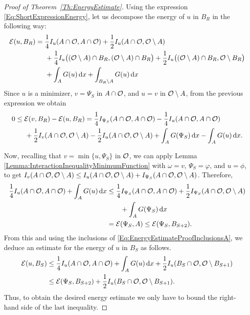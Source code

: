 \begin{proof}[Proof of Theorem~\ref{Th:EnergyEstimate}]
Using the expression \eqref{Eq:ShortExpressionEnergy}, let us decompose the energy of $u$ in $B_R$ in the following way:
\begin{align*}
\mathcal{E}(u,B_R) &= \frac{1}{4}I_u(A \cap \mathcal{O}, A \cap \mathcal{O}) + \frac{1}{2}I_u(A \cap \mathcal{O}, \mathcal{O} \setminus A) \\
& \hspace{5mm} + \frac{1}{4}I_u\big((\mathcal{O} \setminus A) \cap B_R, (\mathcal{O} \setminus A) \cap B_R\big) + \frac{1}{2}I_u\big((\mathcal{O} \setminus A) \cap B_R, \mathcal{O} \setminus B_R\big) \\
& \hspace{5mm} + \int_A G(u) \,\mathrm{d} x + \int_{B_R\setminus A} G(u) \,\mathrm{d} x
\end{align*}
Since $u$ is a minimizer, $v=\Psi_S$ in $A\cap \mathcal{O}$, and $u=v$ in $\mathcal{O}\setminus A$,  from the previous expression we obtain
\begin{align*}
0 &\leq \mathcal{E}(v,B_R)-\mathcal{E}(u,B_R) = \frac{1}{4}I_{\Psi_S}(A \cap \mathcal{O}, A \cap \mathcal{O}) - \frac{1}{4}I_u(A \cap \mathcal{O}, A \cap \mathcal{O})\\
& \hspace{5mm} +  \frac{1}{2} I_v(A \cap \mathcal{O}, \mathcal{O} \setminus A) -  \frac{1}{2} I_u(A \cap \mathcal{O}, \mathcal{O} \setminus A) + \int_A G(\Psi_S) \,\mathrm{d} x - \int_{A} G(u) \,\mathrm{d} x.
\end{align*}

Now, recalling that $v = \min\{u,\Psi_S\}$ in $\mathcal{O}$, we can apply Lemma \ref{Lemma:InteractionInequalityMinimumFunction} with $\omega = v$, $\Psi_S = \varphi$, and $u= \phi$, to get $I_v(A \cap \mathcal{O}, \mathcal{O}\setminus A) \leq I_u(A \cap \mathcal{O}, \mathcal{O}\setminus A) + I_{\Psi_S}(A \cap \mathcal{O}, \mathcal{O}\setminus A)$. Therefore,
\begin{align*}
\frac{1}{4}I_u(A \cap \mathcal{O}, A \cap \mathcal{O}) + \int_{A} G(u) \,\mathrm{d} x &\leq \frac{1}{4}I_{\Psi_S}(A \cap \mathcal{O}, A \cap \mathcal{O}) +  \frac{1}{2} I_{\Psi_S}(A \cap \mathcal{O}, \mathcal{O} \setminus A) \\
& \quad \quad  + \int_A G(\Psi_S)  \,\mathrm{d} x \\
&= \mathcal{E}(\Psi_S, A) \leq \mathcal{E}(\Psi_S,B_{S+2}).
\end{align*}
From this and using the inclusions of \eqref{Eq:EnergyEstimateProofInclusionsA}, we deduce an estimate for the energy of $u$ in $B_S$ as follows.
\begin{align*}
\mathcal{E}(u,B_S) &\leq \frac{1}{4}I_u(A \cap \mathcal{O}, A \cap \mathcal{O}) + \int_{A} G(u) \,\mathrm{d} x +  \frac{1}{2} I_u(B_S \cap \mathcal{O}, \mathcal{O} \setminus B_{S+1}) \\
& \leq  \mathcal{E}(\Psi_S,B_{S+2}) +  \frac{1}{2} I_u(B_S \cap \mathcal{O}, \mathcal{O} \setminus B_{S+1}).
\end{align*}
Thus, to obtain the desired energy estimate we only have to bound the right-hand side of the last inequality.



\end{proof}
